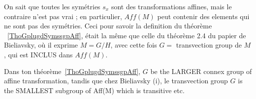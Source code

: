 \begin{enumerate}
On sait que toutes les symétries $s_x$ sont des transformations affines, mais le contraire n’est pas vrai ; en particulier, $Aff(M)$  peut contenir des elements qui ne sont pas des symétries.  Ceci pour savoir la definition du théorème ~\ref{ThoGplugdSymssgpAff}, était la même que celle du théorème 2.4 du papier de Bieliavsky, où il exprime $M=G/H$, avec cette fois $G =$ transvection group de $M$, qui est INCLUS dans $Aff(M)$.

Dans ton théorème~\ref{ThoGplugdSymssgpAff}, $G$ be the LARGER connex group of affine transformation, tandis que chez Bieliavsky (i), le transvection group $G$ is the SMALLEST subgroup of Aff(M) which is transitive etc.

\end{enumerate}

